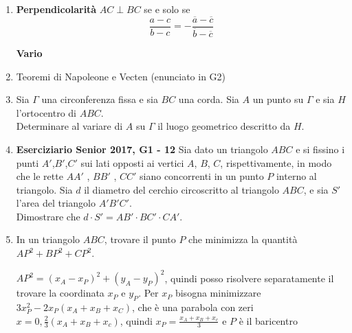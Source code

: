 \begin{enumerate}
\item \textbf{Perpendicolarità} $AC\perp BC$ se e solo se 
$$\frac{a-c}{b-c}= - \frac{\overline{a}-\overline{c}}{\overline{b}-\overline{c}}$$




\textbf{Vario}

\item Teoremi di Napoleone e Vecten (enunciato in G2)

\item Sia $\Gamma$ una circonferenza fissa e sia $BC$ una corda. Sia $A$ un punto su $\Gamma$ e sia $H$ l'ortocentro di $ABC$.\\
Determinare al variare di $A$ su $\Gamma$ il luogo geometrico descritto da $H$.

\item \textbf{Eserciziario Senior 2017, G1 - 12} Sia dato un triangolo $ABC$ e si fissino i punti $A'$,$B'$,$C'$ sui lati opposti ai vertici $A$, $B$,
$C$, rispettivamente, in modo che le rette $AA'$ , $BB'$ , $CC'$ siano concorrenti in un punto $P$ interno al triangolo. Sia $d$ il diametro del cerchio circoscritto al triangolo $ABC$, e sia $S'$ l’area del triangolo $A'B'C'$.\\
Dimostrare che $d \cdot S' = AB'\cdot BC'\cdot CA'$.

\item In un triangolo $ABC$, trovare il punto $P$ che minimizza la quantità $AP^2+BP^2+CP^2$.

\begin{sol}
 $AP^2=(x_A-x_P)^2+(y_A-y_P)^2$, quindi posso risolvere separatamente il trovare la coordinata $x_P$ e $y_P$. 
 Per $x_P$ bisogna minimizzare $3x_P^2-2x_P(x_A+x_B+x_C)$, che è una parabola con zeri $x=0, \frac{2}{3}(x_A+x_B+x_c)$, quindi $x_P=\frac{x_A+x_B+x_c}{3}$ e $P$ è il baricentro
\end{sol}



\end{enumerate}


